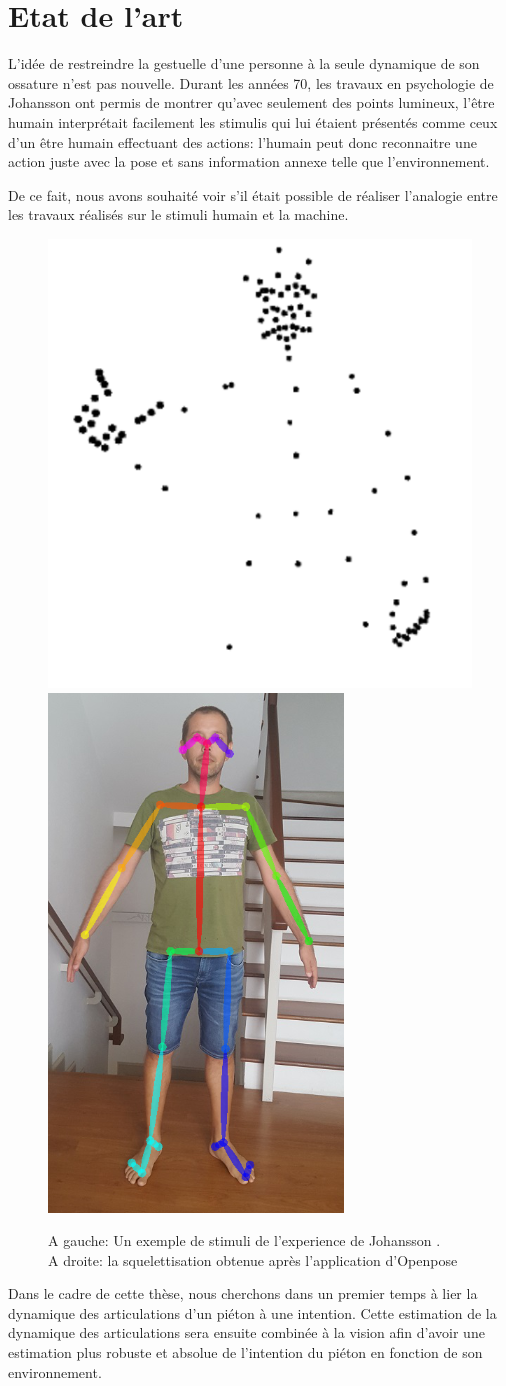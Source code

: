 \chapter{Etat de l'art}
\label{sec:SOTA}

L'idée de restreindre la gestuelle d'une personne à la seule dynamique de son ossature n'est pas nouvelle.
Durant les années 70, les travaux en psychologie de Johansson  \cite{johansson1973visual,johansson1976spatio} ont permis de montrer qu'avec seulement des points lumineux, l'être humain interprétait facilement les stimulis qui lui étaient présentés comme ceux d'un être humain effectuant des actions: l'humain peut donc reconnaitre une action juste avec la pose et sans information annexe telle que l'environnement. 

De ce fait, nous avons souhaité voir s'il était possible de réaliser l'analogie entre les travaux réalisés sur le stimuli humain et la machine.

\begin{figure}[H]
    \centering
    \includegraphics[width=0.34\linewidth]{Images/Johansson.png}
    \includegraphics[width=0.2\linewidth]{Images/openpose2.png}
    \caption{A gauche: Un exemple de stimuli de l'experience de Johansson \cite{johansson1973visual,johansson1976spatio}.\\ A droite: la squelettisation obtenue après l'application d'Openpose \cite{cao2017realtime}}
    \label{fig:Johansson}
\end{figure}

Dans le cadre de cette thèse, nous cherchons dans un premier temps à lier la dynamique des articulations d'un piéton à une intention. Cette estimation de la dynamique des articulations sera ensuite combinée à la vision afin d’avoir une estimation plus robuste et absolue de l'intention du piéton en fonction de son environnement.\\





